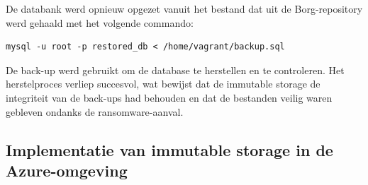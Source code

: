 De databank werd opnieuw opgezet vanuit het bestand dat uit de Borg-repository werd gehaald met het volgende commando:
\begin{lstlisting}[language=script, caption={MySQL commando om een databank te herstellen vanuit een .sql-bestand}]
mysql -u root -p restored_db < /home/vagrant/backup.sql
\end{lstlisting}
De back-up werd gebruikt om de database te herstellen en te controleren. Het herstelproces verliep succesvol, wat bewijst dat de immutable storage de integriteit van de back-ups had behouden en dat de bestanden veilig waren gebleven ondanks de ransomware-aanval.

\newpage
\subsection{Implementatie van immutable storage in de Azure-omgeving}
